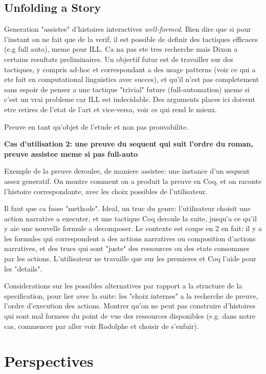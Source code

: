 \documentclass[runningheads,a4paper]{llncs}
\begin{document}
\subsection{Unfolding a Story}
Generation "assistee" d'histoires interactives \emph{well-formed}. Bien dire que si pour l'instant on ne fait que de la verif, il est possible de definir des tactiques efficaces (e.g full auto), meme pour ILL. Ca na pas ete tres recherche mais Dixon a certains resultats preliminaires. Un objectif futur est de travailler sur des tactiques, y compris ad-hoc et correspondant a des usage patterns (voir ce qui a ete fait en computational linguistics avec succes), et qu'il n'est pas completement sans espoir de penser a une tactique "trivial" future (full-automation) meme si c'est un vrai probleme car ILL est indecidable. Des arguments places ici doivent etre retires de l'etat de l'art et vice-versa, voir ce qui rend le mieux.

Preuve en tant qu'objet de l'etude et non pas prouvabilite.

\textbf{Cas d'utilisation 2: une preuve du sequent qui suit l'ordre du roman, preuve assistee meme si pas full-auto}

Exemple de la preuve deroulee, de maniere assistee: une instance d'un sequent assez generatif. On montre comment on a produit la preuve en Coq, et on raconte l'histoire correspondante, avec les choix possibles de l'utilisateur. 

Il faut que ca fasse "methode". Ideal, un truc du genre: l'utilisateur choisit une action narrative a executer, et une tactique Coq deroule la suite, jusqu'a ce qu'il y aie une nouvelle formule a decomposer. Le contexte est coupe en 2 en fait: il y a les formules qui correspondent a des actions narratives ou composition d'actions narratives, et des trucs qui sont "juste" des ressources ou des etats consommes par les actions. L'utilisateur ne travaille que sur les premieres et Coq l'aide pour les "details".

Considerations sur les possibles alternatives par rapport a la structure de la specification, pour lier avec la suite: les "choix internes" a la recherche de preuve, l'ordre d'execution des actions. Montrer qu'on ne peut pas construire d'histoires qui sont mal formees du point de vue des ressources disponibles (e.g. dans notre cas, commencer par aller voir Rodolphe et choisir de s'enfuir).
\section{Perspectives}
\end{document}
